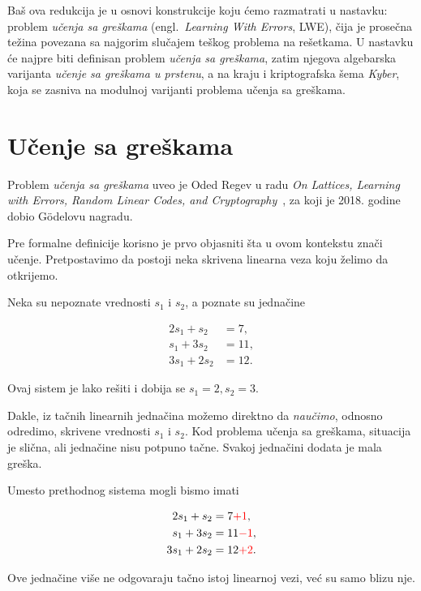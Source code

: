 Baš ova redukcija je u osnovi konstrukcije koju ćemo razmatrati u
nastavku: problem \emph{učenja sa greškama} (engl.\ \emph{Learning With Errors}, LWE),
čija je prosečna težina povezana sa najgorim slučajem teškog problema na rešetkama.
U nastavku će najpre biti definisan problem \emph{učenja sa greškama},
zatim njegova algebarska varijanta \emph{učenje sa greškama u prstenu}, a na kraju i kriptografska šema
\emph{Kyber}, koja se zasniva na modulnoj varijanti problema učenja sa greškama.



\section{Učenje sa greškama}

Problem \emph{učenja sa greškama} uveo je Oded Regev u radu
\emph{On Lattices, Learning with Errors, Random Linear Codes, and Cryptography}~\cite{regev2005lwe},
za koji je 2018. godine dobio G\"odelovu nagradu.

Pre formalne definicije korisno je prvo objasniti šta u ovom kontekstu znači \glqq učenje\grqq.
Pretpostavimo da postoji neka skrivena linearna veza koju želimo da otkrijemo. 

\begin{example}
    \label{ex:lwe-bez-greske}
    Neka su nepoznate vrednosti $s_1$ i $s_2$, a poznate su jednačine
    
    \[
    \begin{aligned}
    2s_1 + s_2 &= 7, \\
    s_1 + 3s_2 &= 11, \\
    3s_1 + 2s_2 &= 12.
    \end{aligned}
    \]

    Ovaj sistem je lako rešiti i dobija se $ s_1 = 2, s_2 = 3. $
\end{example}

Dakle, iz tačnih linearnih jednačina možemo direktno da \emph{naučimo}, 
odnosno odredimo, 
skrivene vrednosti $s_1$ i $s_2$.
Kod problema učenja sa greškama, situacija je slična, ali jednačine nisu potpuno tačne. 
Svakoj jednačini dodata je mala greška. 

\begin{example}
    Umesto prethodnog sistema mogli bismo imati

    \[
    \begin{aligned}
    2s_1 + s_2 &= 7 \textcolor{red}{+ 1}, \\
    s_1 + 3s_2 &= 11 \textcolor{red}{- 1}, \\
    3s_1 + 2s_2 &= 12 \textcolor{red}{+ 2}.
    \end{aligned}
    \]

    Ove jednačine više ne odgovaraju tačno istoj linearnoj vezi, 
    već su samo blizu nje. 
\end{example}

